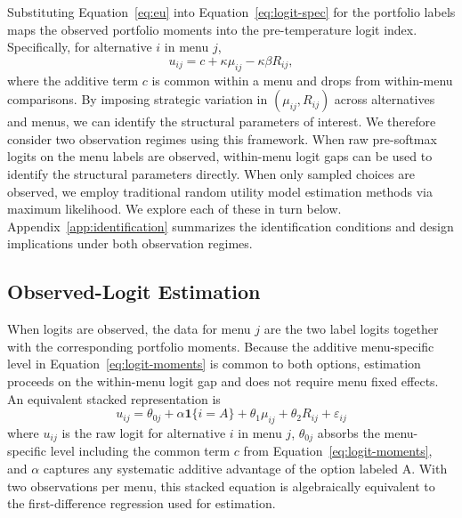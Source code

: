 Substituting Equation~\eqref{eq:eu} into Equation~\eqref{eq:logit-spec} for the portfolio labels maps the observed portfolio moments into the pre-temperature logit index. Specifically, for alternative $i$ in menu $j$,
\begin{equation}\label{eq:logit-moments}
  u_{ij} = c + \kappa \mu_{ij} - \kappa \beta R_{ij},
\end{equation}
where the additive term $c$ is common within a menu and drops from within-menu comparisons. By imposing strategic variation in $(\mu_{ij}, R_{ij})$ across alternatives and menus, we can identify the structural parameters of interest. We therefore consider two observation regimes using this framework. When raw pre-softmax logits on the menu labels are observed, within-menu logit gaps can be used to identify the structural parameters directly. When only sampled choices are observed, we employ traditional random utility model estimation methods via maximum likelihood. We explore each of these in turn below. Appendix~\ref{app:identification} summarizes the identification conditions and design implications under both observation regimes.

\subsection{Observed-Logit Estimation}

When logits are observed, the data for menu $j$ are the two label logits together with the corresponding portfolio moments. Because the additive menu-specific level in Equation~\eqref{eq:logit-moments} is common to both options, estimation proceeds on the within-menu logit gap and does not require menu fixed effects. An equivalent stacked representation is
\begin{equation}\label{eq:empirical-spec}
  u_{ij} = \theta_{0j} + \alpha \mathbf{1}\{i=A\} + \theta_1 \mu_{ij} + \theta_2 R_{ij} + \varepsilon_{ij}
\end{equation}
where $u_{ij}$ is the raw logit for alternative $i$ in menu $j$, $\theta_{0j}$ absorbs the menu-specific level including the common term $c$ from Equation~\eqref{eq:logit-moments}, and $\alpha$ captures any systematic additive advantage of the option labeled A. With two observations per menu, this stacked equation is algebraically equivalent to the first-difference regression used for estimation.

